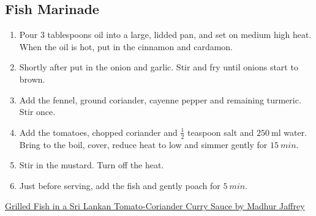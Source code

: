 \documentclass[11pt,a4paper]{article}
\begin{document}
\subsection*{Fish Marinade}

\begin{enumerate}
  \item Pour $ 3 $ tablespoons oil into a large, lidded pan, and set on medium high heat. When the oil is hot, put in the cinnamon and cardamon.
  \item Shortly after put in the onion and garlic. Stir and fry until onions start to brown.
  \item Add the fennel, ground coriander, cayenne pepper and remaining turmeric. Stir once.
  \item Add the tomatoes, chopped coriander and $ \frac {1}{2} $ teaspoon salt and $ \qty{250}{\ml} $ water. Bring to the boil, cover, reduce heat to low and simmer gently for $ \qty{15}{min} $.
  \item Stir in the mustard. Turn off the heat.
  \item Just before serving, add the fish and gently poach for $ \qty{5}{min} $.
\end{enumerate}

\href{https://www.eatyourbooks.com/library/recipes/423431/grilled-fish-in-a-sri}{Grilled Fish in a Sri Lankan Tomato-Coriander Curry Sauce by Madhur Jaffrey}
\end{document}

